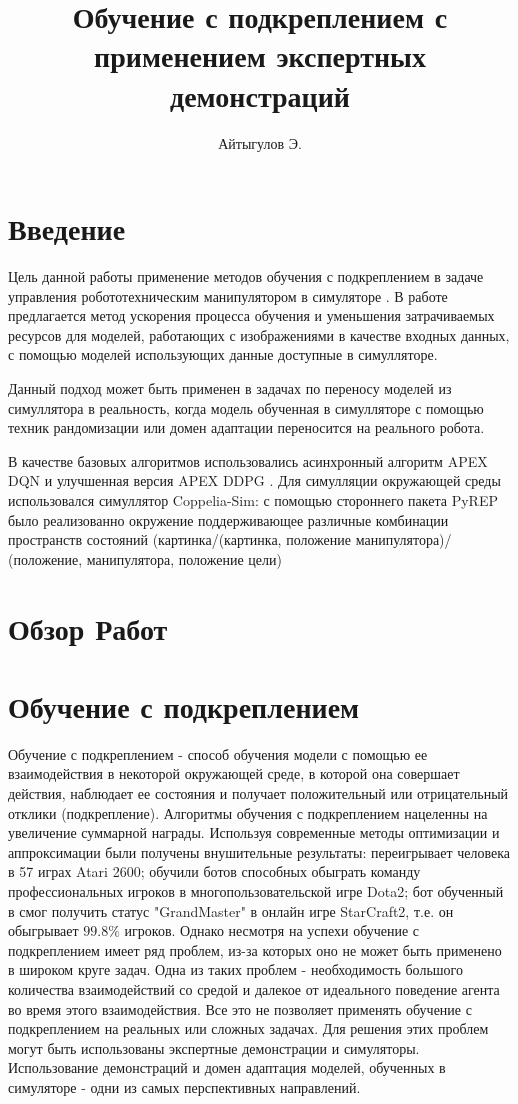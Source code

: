 \documentclass{mipt-thesis-bs}
\title{Обучение с подкреплением с применением экспертных демонстраций}
\author{Айтыгулов Э.}
\begin{document}
\frontmatter
\titlecontents

\chapter{Введение}

Цель данной работы применение методов обучения с подкреплением в задаче управления робототехническим манипулятором в симуляторе \cite{}. В работе предлагается метод ускорения процесса обучения и уменьшения затрачиваемых ресурсов для моделей, работающих с изображениями в качестве входных данных, с помощью моделей использующих данные доступные в симулляторе. 

Данный подход может быть применен в задачах по переносу моделей из симуллятора в реальность, когда модель обученная в симулляторе с помощью техник рандомизации или домен адаптации переносится на реального робота.

В качестве базовых алгоритмов использовались асинхронный алгоритм APEX DQN \cite{} и улучшенная версия APEX DDPG  \cite{}. Для симулляции окружающей среды использовался симуллятор Coppelia-Sim: с помощью стороннего пакета PyREP было реализованно окружение поддерживающее различные комбинации пространств состояний (картинка/(картинка, положение манипулятора)/ (положение, манипулятора, положение цели)

\chapter{Обзор Работ}



\mainmatter


\chapter{Обучение с подкреплением}

Обучение с подкреплением - способ обучения модели с помощью ее взаимодействия в некоторой окружающей среде, в которой она совершает действия, наблюдает ее состояния и получает положительный или отрицательный отклики (подкрепление). Алгоритмы обучения с подкреплением нацеленны на увеличение суммарной награды.
Используя современные методы оптимизации и аппроксимации были получены внушительные результаты: \cite{Agent-57} переигрывает человека в 57 играх Atari 2600; \cite{OpenAI}  обучили ботов способных обыграть команду профессиональных игроков в многопользовательской игре Dota2; бот обученный в \cite{DeepMind} смог получить статус "GrandMaster" в онлайн игре StarCraft2, т.е. он обыгрывает $99.8\%$ игроков. Однако несмотря на успехи обучение с подкреплением имеет ряд проблем, из-за которых оно не может быть применено в широком круге задач. Одна из таких проблем - необходимость большого количества взаимодействий со средой и далекое от идеального поведение агента во время этого взаимодействия. Все это не позволяет применять обучение с подкреплением на реальных или сложных задачах. Для решения этих проблем могут быть использованы экспертные демонстрации и симуляторы. Использование демонстраций и домен адаптация моделей, обученных в симуляторе - одни из самых перспективных направлений.
\end{document}
